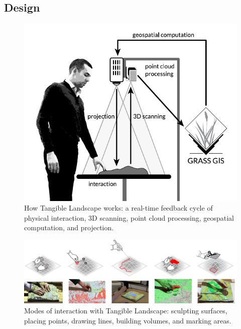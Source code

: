 \documentclass[prodmode,acmtochi]{acmsmall} %
\begin{document}
\subsection{Design}

\begin{figure}
\begin{center}
		\includegraphics{images/system_schema.pdf}
	\caption{How Tangible Landscape works: a real-time feedback cycle of physical interaction, 3D scanning, point cloud processing, geospatial computation, and projection.}
	\label{fig:system_schema}
\end{center}
\end{figure}

\begin{figure}
\begin{center}
		\includegraphics[width=\textwidth]{images/interactions.png}
	\caption{Modes of interaction with Tangible Landscape: sculpting surfaces, placing points, drawing lines, building volumes, and marking areas.}
	\label{fig:interactions}
\end{center}
\end{figure}
\end{document}
